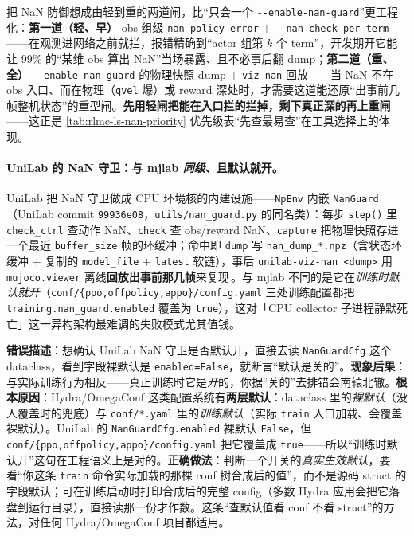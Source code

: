 \begin{insight}\label{ins:rlmc-ls-nan-layered}
把 NaN 防御想成由轻到重的两道闸，比“只会一个 \verb|--enable-nan-guard|”更工程化：\textbf{第一道（轻、早）} obs 组级 \verb|nan-policy error| $+$ \verb|--nan-check-per-term|——在观测进网络之前就拦，报错精确到“actor 组第 $k$ 个 term”，开发期开它能让 99\% 的“某维 obs 算出 NaN”当场暴露、且不必事后翻 dump；\textbf{第二道（重、全）} \verb|--enable-nan-guard| 的物理快照 dump $+$ \verb|viz-nan| 回放——当 NaN 不在 obs 入口、而在物理（\verb|qvel| 爆）或 reward 深处时，才需要这道能还原“出事前几帧整机状态”的重型闸。\textbf{先用轻闸把能在入口拦的拦掉，剩下真正深的再上重闸}——这正是 \cref{tab:rlmc-ls-nan-priority} 优先级表“先查最易查”在工具选择上的体现。
\end{insight}

\paragraph{UniLab 的 NaN 守卫：与 mjlab \emph{同级}、且默认就开。}UniLab 把 NaN 守卫做成 CPU 环境核的内建设施——\verb|NpEnv| 内嵌 \verb|NanGuard|（UniLab commit \texttt{99936e08}，\texttt{utils/nan\_guard.py} 的同名类）：每步 \verb|step()| 里 \verb|check_ctrl| 查动作 NaN、\verb|check| 查 obs/reward NaN、\verb|capture| 把物理快照存进一个最近 \verb|buffer_size| 帧的环缓冲；命中即 \verb|dump| 写 \verb|nan_dump_*.npz|（含状态环缓冲 $+$ 复制的 \verb|model_file| $+$ \verb|latest| 软链），事后 \verb|unilab-viz-nan <dump>| 用 \verb|mujoco.viewer| 离线\textbf{回放出事前那几帧}来复现\,\cite{unilab2026}。与 mjlab 不同的是它在\emph{训练时默认就开}（\verb|conf/{ppo,offpolicy,appo}/config.yaml| 三处训练配置都把 \verb|training.nan_guard.enabled| 覆盖为 \verb|true|），这对「CPU collector 子进程静默死亡」这一异构架构最难调的失败模式尤其值钱。

\begin{pitfall}
\textbf{错误描述}：想确认 UniLab NaN 守卫是否默认开，直接去读 \verb|NanGuardCfg| 这个 dataclass，看到字段裸默认是 \verb|enabled=False|，就断言“默认是关的”。\textbf{现象后果}：与实际训练行为相反——真正训练时它是\emph{开}的，你据“关的”去排错会南辕北辙。\textbf{根本原因}：Hydra/OmegaConf 这类配置系统有\textbf{两层默认}：dataclass 里的\emph{裸默认}（没人覆盖时的兜底）与 \verb|conf/*.yaml| 里的\emph{训练默认}（实际 \verb|train| 入口加载、会覆盖裸默认）。UniLab 的 \verb|NanGuardCfg.enabled| 裸默认 \verb|False|，但 \verb|conf/{ppo,offpolicy,appo}/config.yaml| 把它覆盖成 \verb|true|——所以“训练时默认开”这句在工程语义上是对的。\textbf{正确做法}：判断一个开关的\emph{真实生效默认}，要看“你这条 \verb|train| 命令实际加载的那棵 conf 树合成后的值”，而不是源码 struct 的字段默认；可在训练启动时打印合成后的完整 config（多数 Hydra 应用会把它落盘到运行目录），直接读那一份才作数。这条“查默认值看 conf 不看 struct”的方法，对任何 Hydra/OmegaConf 项目都适用。
\end{pitfall}

